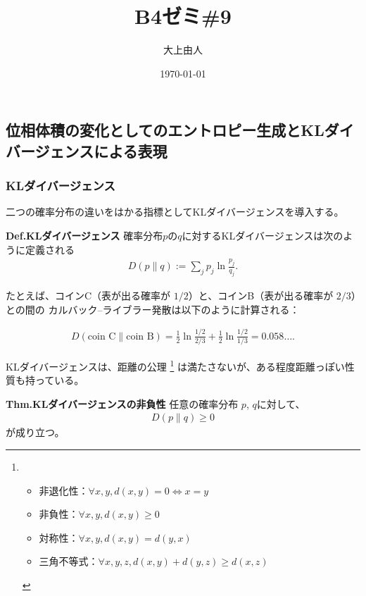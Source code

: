 \documentclass[a4paper,11pt]{jsarticle}
\numberwithin{equation}{section}
\begin{document}
\title{B4ゼミ\#9}
\author{大上由人}
\date{\today}
\maketitle

\setcounter{section}{5}
\setcounter{subsection}{2}
\subsection{位相体積の変化としてのエントロピー生成とKLダイバージェンスによる表現}
\subsubsection{KLダイバージェンス}
二つの確率分布の違いをはかる指標としてKLダイバージェンスを導入する。

\begin{itembox}[l]{\textbf{Def.KLダイバージェンス}}
    確率分布$p$の$q$に対するKLダイバージェンスは次のように定義される
\begin{align}
    D(p \| q) := \sum_j p_j \ln \frac{p_j}{q_j}.
\end{align}
\end{itembox}

たとえば、コインC（表が出る確率が $1/2$）と、コインB（表が出る確率が $2/3$）との間の
カルバック–ライブラー発散は以下のように計算される：

\begin{align}
D(\text{coin C} \| \text{coin B}) 
= \frac{1}{2} \ln \frac{1/2}{2/3} + \frac{1}{2} \ln \frac{1/2}{1/3}
= 0.058 \dots. 
\end{align}

KLダイバージェンスは、距離の公理
\footnote{
    \begin{itemize}
        \item 非退化性：$\forall x, y, d(x, y) = 0 \Leftrightarrow x = y$
        \item 非負性：$\forall x, y, d(x, y) \geq 0$
        \item 対称性：$\forall x, y, d(x, y) = d(y, x)$
        \item 三角不等式：$\forall x, y, z, d(x, y) + d(y, z) \geq d(x, z)$
    \end{itemize}
        
}
は満たさないが、ある程度距離っぽい性質も持っている。
\begin{itembox}[l]{\textbf{Thm.KLダイバージェンスの非負性}}
    任意の確率分布 $p$, $q$に対して、
    \begin{align}
D(p \| q) \geq 0 
\end{align}
    が成り立つ。
\end{itembox}
\end{document}
